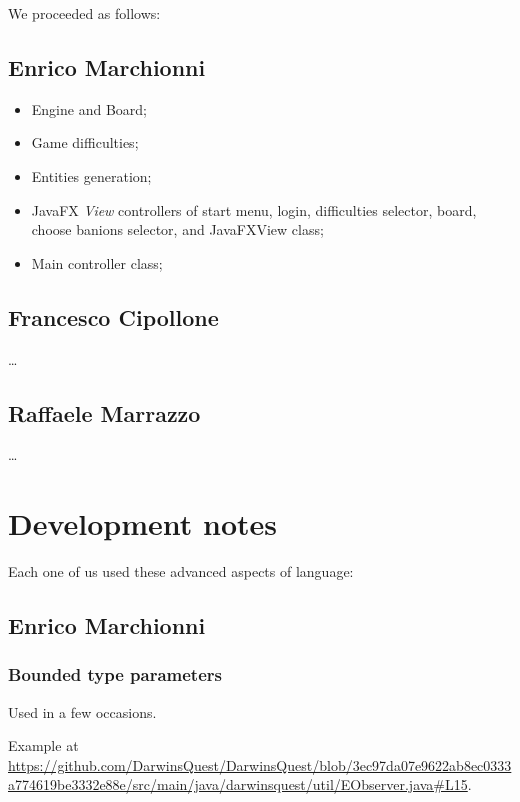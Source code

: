 \documentclass[12pt, a4paper]{report}
\begin{document}
    We proceeded as follows:

    \subsection*{Enrico Marchionni}

    \begin{itemize}
        \item Engine and Board;
        \item Game difficulties;
        \item Entities generation;
        \item JavaFX \emph{View} controllers of start menu, login, difficulties selector, board, choose banions selector, and JavaFXView class;
        \item Main controller class;
    \end{itemize}

    \subsection*{Francesco Cipollone}

    \dots

    \subsection*{Raffaele Marrazzo}

    \dots

\section{Development notes}

    Each one of us used these advanced aspects of language:

    \subsection*{Enrico Marchionni}

        \subsubsection{Bounded type parameters}

        Used in a few occasions.

        Example at \url{https://github.com/DarwinsQuest/DarwinsQuest/blob/3ec97da07e9622ab8ec0333a774619be3332e88e/src/main/java/darwinsquest/util/EObserver.java#L15}.
\end{document}
